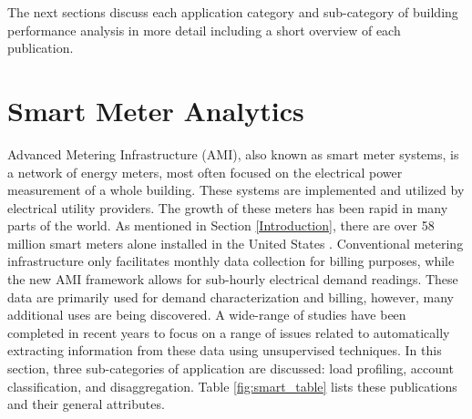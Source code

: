 \documentclass[preprint,12pt,3p]{elsarticle}
\begin{document}
The next sections discuss each application category and sub-category of building performance analysis in more detail including a short overview of each publication.


\section{Smart Meter Analytics}
\label{SmartMeter}
Advanced Metering Infrastructure (AMI), also known as smart meter systems, is a network of energy meters, most often focused on the electrical power measurement of a whole building. These systems are implemented and utilized by electrical utility providers. The growth of these meters has been rapid in many parts of the world. As mentioned in Section \ref{Introduction}, there are over 58 million smart meters alone installed in the United States \cite{energy_information_administration_how_2015}. Conventional metering infrastructure only facilitates monthly data collection for billing purposes, while the new AMI framework allows for sub-hourly electrical demand readings. These data are primarily used for demand characterization and billing, however, many additional uses are being discovered. A wide-range of studies have been completed in recent years to focus on a range of issues related to automatically extracting information from these data using unsupervised techniques. In this section, three sub-categories of application are discussed: load profiling, account classification, and disaggregation. Table \ref{fig:smart_table} lists these publications and their general attributes.
\end{document}
